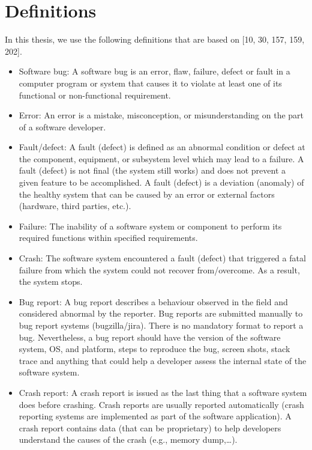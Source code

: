 \documentclass[12pt]{report}
\providecommand{\tightlist}{%
  \setlength{\itemsep}{0pt}\setlength{\parskip}{0pt}}
\begin{document}
\section{\texorpdfstring{Definitions\label{sec:version-control}}{Definitions}}\label{definitions}

In this thesis, we use the following definitions that are based on
{[}10, 30, 157, 159, 202{]}.

\begin{itemize}
\tightlist
\item
  Software bug: A software bug is an error, flaw, failure, defect or
  fault in a computer program or system that causes it to violate at
  least one of its functional or non-functional requirement.
\item
  Error: An error is a mistake, misconception, or misunderstanding on
  the part of a software developer.
\item
  Fault/defect: A fault (defect) is defined as an abnormal condition or
  defect at the component, equipment, or subsystem level which may lead
  to a failure. A fault (defect) is not final (the system still works)
  and does not prevent a given feature to be accomplished. A fault
  (defect) is a deviation (anomaly) of the healthy system that can be
  caused by an error or external factors (hardware, third parties,
  etc.).
\item
  Failure: The inability of a software system or component to perform
  its required functions within specified requirements.
\item
  Crash: The software system encountered a fault (defect) that triggered
  a fatal failure from which the system could not recover from/overcome.
  As a result, the system stops.
\item
  Bug report: A bug report describes a behaviour observed in the field
  and considered abnormal by the reporter. Bug reports are submitted
  manually to bug report systems (bugzilla/jira). There is no mandatory
  format to report a bug. Nevertheless, a bug report should have the
  version of the software system, OS, and platform, steps to reproduce
  the bug, screen shots, stack trace and anything that could help a
  developer assess the internal state of the software system.
\item
  Crash report: A crash report is issued as the last thing that a
  software system does before crashing. Crash reports are usually
  reported automatically (crash reporting systems are implemented as
  part of the software application). A crash report contains data (that
  can be proprietary) to help developers understand the causes of the
  crash (e.g., memory dump,\ldots{}).
\end{itemize}
\end{document}
